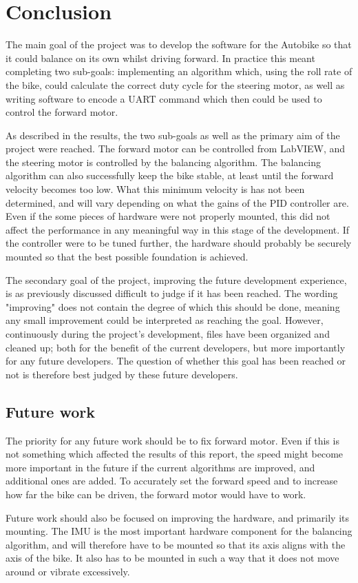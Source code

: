 \chapter{Conclusion}

The main goal of the project was to develop the software for the Autobike so that it could balance on its own whilst driving forward. In practice this meant completing two sub-goals: implementing an algorithm which, using the roll rate of the bike, could calculate the correct duty cycle for the steering motor, as well as writing software to encode a UART command which then could be used to control the forward motor.

As described in the results, the two sub-goals as well as the primary aim of the project were reached. The forward motor can be controlled from LabVIEW, and the steering motor is controlled by the balancing algorithm. The balancing algorithm can also successfully keep the bike stable, at least until the forward velocity becomes too low. What this minimum velocity is has not been determined, and will vary depending on what the gains of the PID controller are. Even if the some pieces of hardware were not properly mounted, this did not affect the performance in any meaningful way in this stage of the development. If the controller were to be tuned further, the hardware should probably be securely mounted so that the best possible foundation is achieved.

The secondary goal of the project, improving the future development experience, is as previously discussed difficult to judge if it has been reached. The wording "improving" does not contain the degree of which this should be done, meaning any small improvement could be interpreted as reaching the goal. However, continuously during the project's development, files have been organized and cleaned up; both for the benefit of the current developers, but more importantly for any future developers. The question of whether this goal has been reached or not is therefore best judged by these future developers.

\section{Future work}

The priority for any future work should be to fix forward motor. Even if this is not something which affected the results of this report, the speed might become more important in the future if the current algorithms are improved, and additional ones are added. To accurately set the forward speed and to increase how far the bike can be driven, the forward motor would have to work.

Future work should also be focused on improving the hardware, and primarily its mounting. The IMU is the most important hardware component for the balancing algorithm, and will therefore have to be mounted so that its axis aligns with the axis of the bike. It also has to be mounted in such a way that it does not move around or vibrate excessively.